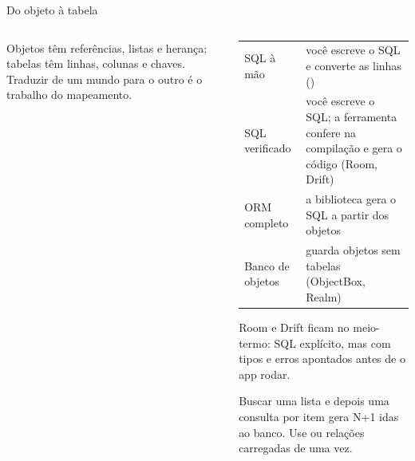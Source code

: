 \begin{frame}{Do objeto à tabela}
  \begin{columns}[c]
    \begin{column}{0.46\textwidth}
      \centering
      \begin{definicao}
        Objetos têm referências, listas e herança; tabelas têm linhas, colunas e chaves. Traduzir de um mundo para o outro é o trabalho do mapeamento.
      \end{definicao}
    \end{column}
    \begin{column}{0.52\textwidth}
      \scriptsize
      \begin{tabularx}{\linewidth}{@{}l L@{}}
        \toprule
         &  \\
        \midrule
        SQL à mão & você escreve o SQL e converte as linhas () \\
        SQL verificado & você escreve o SQL; a ferramenta confere na compilação e gera o código (Room, Drift) \\
        ORM completo & a biblioteca gera o SQL a partir dos objetos \\
        Banco de objetos & guarda objetos sem tabelas (ObjectBox, Realm) \\
        \bottomrule
      \end{tabularx}
      \normalsize
      \begin{dica}
        Room e Drift ficam no meio-termo: SQL explícito, mas com tipos e erros apontados antes de o app rodar.
      \end{dica}
      \begin{atencao}[O problema N+1]
        Buscar uma lista e depois uma consulta por item gera N+1 idas ao banco. Use  ou relações carregadas de uma vez.
      \end{atencao}
    \end{column}
  \end{columns}
\end{frame}

